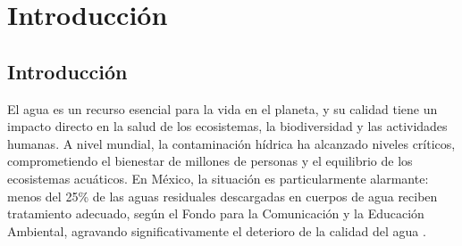 \chapter{Introducción}

\section{Introducción}

El agua es un recurso esencial para la vida en el planeta, y su calidad tiene un impacto directo en la salud de los ecosistemas, la biodiversidad y las actividades humanas. A nivel mundial, la contaminación hídrica ha alcanzado niveles críticos, comprometiendo el bienestar de millones de personas y el equilibrio de los ecosistemas acuáticos. En México, la situación es particularmente alarmante: menos del 25\% de las aguas residuales descargadas en cuerpos de agua reciben tratamiento adecuado, según el Fondo para la Comunicación y la Educación Ambiental, agravando significativamente el deterioro de la calidad del agua \cite{agua2006}.






